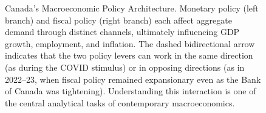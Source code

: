\begin{figure}[H]
\caption{Canada's Macroeconomic Policy Architecture.
Monetary policy (left branch) and fiscal policy (right branch) each
affect aggregate demand through distinct channels, ultimately influencing
GDP growth, employment, and inflation. The dashed bidirectional arrow
indicates that the two policy levers can work in the same direction
(as during the COVID stimulus) or in opposing directions (as in 2022--23,
when fiscal policy remained expansionary even as the Bank of Canada
was tightening). Understanding this interaction is one of the central
analytical tasks of contemporary macroeconomics.}
\label{fig:policy_framework}
\end{figure}

